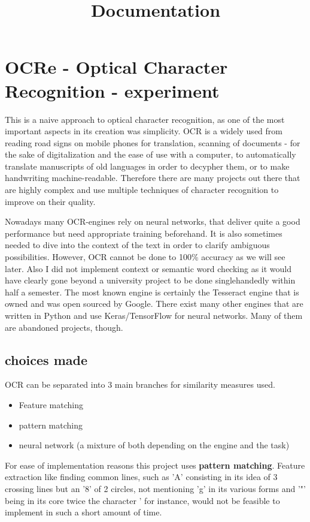 \documentclass[12pt]{scrartcl}
\begin{document}
\title {Documentation}
\section {OCRe - Optical Character Recognition - experiment}
This is a naive approach to optical character recognition, as one of the most important aspects in its creation was simplicity. OCR is a widely used from reading road signs on mobile phones for translation, scanning of documents - for the sake of digitalization and the ease of use with a computer, to automatically translate manuscripts of old languages in order to decypher them, or to make handwriting machine-readable. Therefore there are many projects out there that are highly complex and use multiple techniques of character recognition to improve on their quality.

Nowadays many OCR-engines rely on neural networks, that deliver quite a good performance but need appropriate training beforehand. It is also sometimes needed to dive into the context of the text in order to clarify ambiguous possibilities. However, OCR cannot be done to 100\% accuracy as we will see later. Also I did not implement context or semantic word checking as it would have clearly gone beyond a university project to be done singlehandedly within half a semester.\newline
The most known engine is certainly the Tesseract engine that is owned and was open sourced by Google.\newline
There exist many other engines that are written in Python and use Keras/TensorFlow for neural networks. Many of them are abandoned projects, though.


\subsection{choices made}
OCR can be separated into 3 main branches for similarity measures used.
\begin{itemize}
\item Feature matching
\item pattern matching
\item neural network (a mixture of both depending on the engine and the task)
\end{itemize}

For ease of implementation reasons this project uses \textbf{pattern matching}.\newline
Feature extraction like finding common lines, such as 'A' consisting in its idea of 3 crossing lines but an '8' of 2 circles, not mentioning 'g' in its various forms and '"' being in its core twice the character ' for instance, would not be feasible to implement in such a short amount of time.
\end{document}
